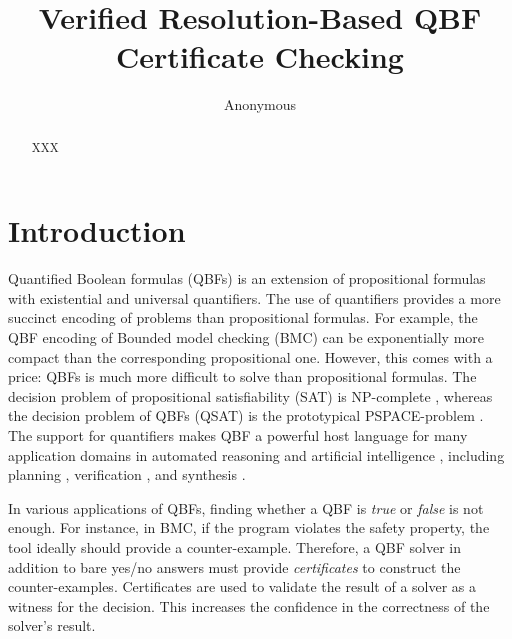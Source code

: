 \documentclass[runningheads]{llncs}
\newcommand{\0}{0}
\newcommand{\1}{1}
\begin{document}

%
\title{Verified Resolution-Based QBF Certificate Checking}


%
\author{Anonymous}

%
%
\maketitle              %
%
\begin{abstract} 
 XXX

\end{abstract}

\section{Introduction}
\label{sec:intro}
Quantified Boolean formulas (QBFs) is an extension of propositional formulas with existential and universal quantifiers. The use of quantifiers provides a more succinct encoding of problems than propositional formulas. For example, the QBF encoding of Bounded model checking (BMC) \cite{DershowitzHK05} can be exponentially more compact than the corresponding propositional one. However, this comes with a price: QBFs is much more difficult to solve than propositional formulas. The decision problem of propositional satisfiability (SAT) is NP-complete \cite{Cook71}, whereas the decision problem of QBFs (QSAT) is the prototypical PSPACE-problem \cite{StockmeyerM73}. The support for quantifiers makes QBF a powerful host language for many application domains in automated reasoning and artificial intelligence \cite{ShuklaBPS19}, including planning \cite{AnsoteguiGS05, EglyKLP17, Cashmore2012planning, Gasquet18}, verification \cite{MillerSB13}, and synthesis \cite{BloemKS14, BloemEKKL14, Gange2014synthesizing}. 

In various applications of QBFs, finding whether a QBF is \textit{true} or \textit{false} is not enough. For instance, in BMC, if the program violates the safety property, the tool ideally should provide a counter-example. Therefore, a QBF solver in addition to bare yes/no answers must provide \textit{certificates} to construct the counter-examples. Certificates are used to validate the result of a solver as a witness for the decision. This increases the confidence in the correctness of the solver's result.
\end{document}
